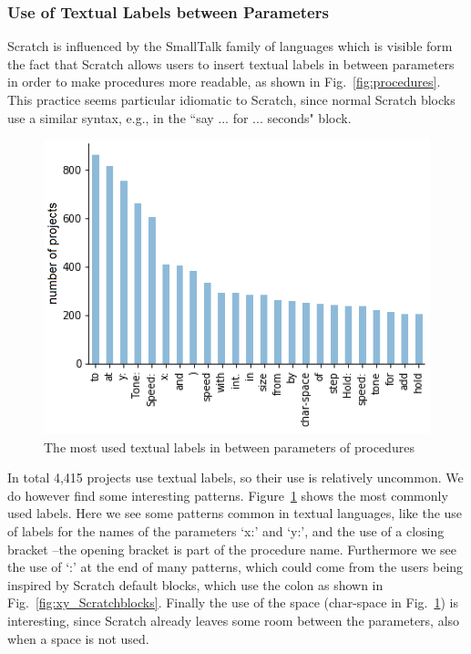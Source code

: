 \documentclass[conference]{IEEEtran}
\begin{document}
\subsubsection{Use of Textual Labels between Parameters}
Scratch is influenced by the SmallTalk family of languages which is visible form the fact that Scratch allows users to insert textual labels in between parameters in order to make procedures more readable, as shown in Fig.~\ref{fig:procedures}.
This practice seems particular idiomatic to Scratch, since normal Scratch blocks use a similar syntax, e.g., in the ``say ... for ... seconds" block. 
\begin{figure}
	\begin{center}
		\includegraphics[width=\columnwidth]{fig/project/labels_in_procedures}
		\caption{The most used textual labels in between parameters of procedures}
		\label{fig:labels}
	\end{center}
\end{figure} 
In total 4,415 projects use textual labels, so their use is relatively uncommon. We do however find some interesting patterns. 
Figure~\ref{fig:labels} shows the most commonly used labels. Here we see some patterns common in textual languages, like the use of labels for the names of the parameters `x:' and `y:', and the use of a closing bracket --the opening bracket is part of the procedure name. 
Furthermore we see the use of `:' at the end of many patterns, which could come from the users being inspired by Scratch default blocks, which use the colon as shown in Fig.~\ref{fig:xy_Scratchblocks}. 
Finally the use of the space (char-space in Fig.~\ref{fig:labels}) is interesting, since Scratch already leaves some room between the parameters, also when a space is not used. 
\end{document}
